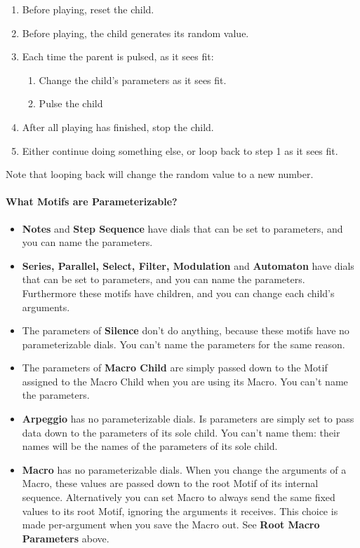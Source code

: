\documentclass[twoside,10pt]{article}
\begin{document}
\begin{enumerate}
\item Before playing, reset the child.
\item Before playing, the child generates its random value.
\item Each time the parent is pulsed, as it sees fit:
\begin{enumerate}
\item Change the child's parameters as it sees fit.
\item Pulse the child
\end{enumerate}
\item After all playing has finished, stop the child.
\item Either continue doing something else, or loop back to step 1 as it sees fit. 
\end{enumerate}

Note that looping back will change the random value to a new number.

\paragraph{What Motifs are Parameterizable?}

\begin{itemize}
\item {\bf Notes} and {\bf Step Sequence} have dials that can be set to parameters, and you can name the parameters.
\item {\bf Series, Parallel, Select, Filter, Modulation} and {\bf Automaton} have dials that can be set to parameters, and you can name the parameters.  Furthermore these motifs have children, and you can change each child's arguments.
\item The parameters of {\bf Silence} don't do anything, because these motifs have no parameterizable dials.    You can't name the parameters for the same reason.
\item The parameters of {\bf Macro Child} are simply passed down to the Motif assigned to the Macro Child when you are using its Macro.  You can't name the parameters.
\item {\bf Arpeggio} has no parameterizable dials.   Is parameters are simply set to pass data down to the parameters of its sole child.  You can't name them: their names will be the names of the parameters of its sole child.
\item {\bf Macro} has no parameterizable dials.  When you change the arguments of a Macro, these values are passed down to the root Motif of its internal sequence.  Alternatively you can set Macro to always send the same fixed values to its root Motif, ignoring the arguments it receives.  This choice is made per-argument when you save the Macro out.  See {\bf Root Macro Parameters} above.
\end{itemize}
\end{document}
